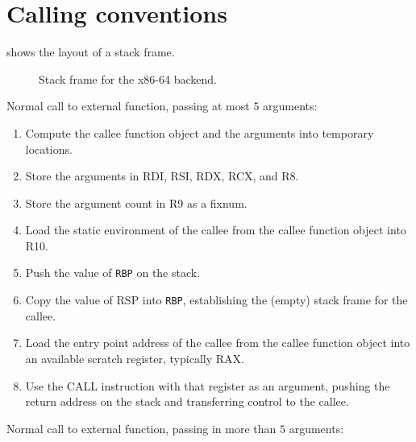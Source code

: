 \section{Calling conventions}

 shows the layout of a stack frame.

\begin{figure}
\begin{center}
\end{center}
\caption{\label{fig-x86-64-stack-frame}
Stack frame for the x86-64 backend.}
\end{figure}

Normal call to external function, passing at most $5$ arguments:

\begin{enumerate}
\item Compute the callee function object and the arguments into
  temporary locations.
\item Store the arguments in RDI, RSI, RDX, RCX, and R8.
\item Store the argument count in R9 as a fixnum.
\item Load the static environment of the callee from the callee
  function object into R10.
\item Push the value of \texttt{RBP} on the stack.
\item Copy the value of RSP into \texttt{RBP}, establishing the
  (empty) stack frame for the callee.
\item Load the entry point address of the callee from the callee
  function object into an available scratch register, typically RAX.
\item Use the CALL instruction with that register as an argument,
  pushing the return address on the stack and transferring control to
  the callee.
\end{enumerate}

Normal call to external function, passing in more than $5$ arguments:

